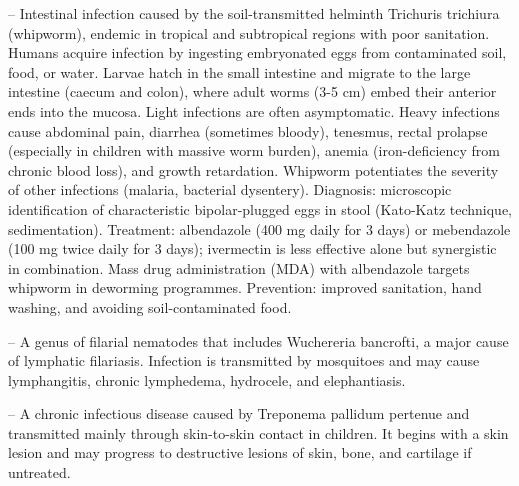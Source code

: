 -- Intestinal infection caused by the soil-transmitted helminth Trichuris trichiura (whipworm), endemic in tropical and subtropical regions with poor sanitation. Humans acquire infection by ingesting embryonated eggs from contaminated soil, food, or water. Larvae hatch in the small intestine and migrate to the large intestine (caecum and colon), where adult worms (3-5 cm) embed their anterior ends into the mucosa. Light infections are often asymptomatic. Heavy infections cause abdominal pain, diarrhea (sometimes bloody), tenesmus, rectal prolapse (especially in children with massive worm burden), anemia (iron-deficiency from chronic blood loss), and growth retardation. Whipworm potentiates the severity of other infections (malaria, bacterial dysentery). Diagnosis: microscopic identification of characteristic bipolar-plugged eggs in stool (Kato-Katz technique, sedimentation). Treatment: albendazole (400 mg daily for 3 days) or mebendazole (100 mg twice daily for 3 days); ivermectin is less effective alone but synergistic in combination. Mass drug administration (MDA) with albendazole targets whipworm in deworming programmes. Prevention: improved sanitation, hand washing, and avoiding soil-contaminated food.

-- A genus of filarial nematodes that includes Wuchereria bancrofti, a major cause of lymphatic filariasis. Infection is transmitted by mosquitoes and may cause lymphangitis, chronic lymphedema, hydrocele, and elephantiasis.

-- A chronic infectious disease caused by Treponema pallidum pertenue and transmitted mainly through skin-to-skin contact in children. It begins with a skin lesion and may progress to destructive lesions of skin, bone, and cartilage if untreated.

